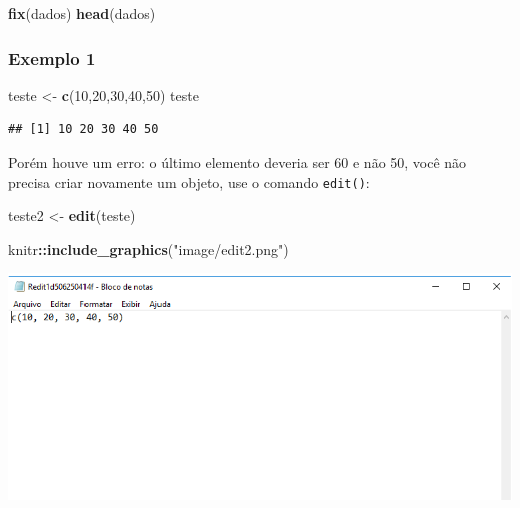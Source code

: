 \documentclass[
]{book}
\newenvironment{Shaded}{\begin{snugshade}}{\end{snugshade}}
\newcommand{\DecValTok}[1]{\textcolor[rgb]{0.00,0.00,0.81}{#1}}
\newcommand{\KeywordTok}[1]{\textcolor[rgb]{0.13,0.29,0.53}{\textbf{#1}}}
\newcommand{\NormalTok}[1]{#1}
\newcommand{\OperatorTok}[1]{\textcolor[rgb]{0.81,0.36,0.00}{\textbf{#1}}}
\newcommand{\StringTok}[1]{\textcolor[rgb]{0.31,0.60,0.02}{#1}}
\begin{document}
\begin{Shaded}
\begin{Highlighting}[]
\KeywordTok{fix}\NormalTok{(dados)}
\KeywordTok{head}\NormalTok{(dados)}
\end{Highlighting}
\end{Shaded}

\hypertarget{exemplo-1}{%
\subsubsection{Exemplo 1}\label{exemplo-1}}

\begin{Shaded}
\begin{Highlighting}[]
\NormalTok{teste <-}\StringTok{ }\KeywordTok{c}\NormalTok{(}\DecValTok{10}\NormalTok{,}\DecValTok{20}\NormalTok{,}\DecValTok{30}\NormalTok{,}\DecValTok{40}\NormalTok{,}\DecValTok{50}\NormalTok{)}
\NormalTok{teste}
\end{Highlighting}
\end{Shaded}

\begin{verbatim}
## [1] 10 20 30 40 50
\end{verbatim}

Porém houve um erro: o último elemento deveria ser 60 e não 50, você não precisa criar novamente um objeto, use o comando \texttt{edit()}:

\begin{Shaded}
\begin{Highlighting}[]
\NormalTok{teste2 <-}\StringTok{ }\KeywordTok{edit}\NormalTok{(teste)}
\end{Highlighting}
\end{Shaded}

\begin{Shaded}
\begin{Highlighting}[]
\NormalTok{knitr}\OperatorTok{::}\KeywordTok{include_graphics}\NormalTok{(}\StringTok{"image/edit2.png"}\NormalTok{)}
\end{Highlighting}
\end{Shaded}

\includegraphics[width=10.54in]{image/edit2}
\end{document}
